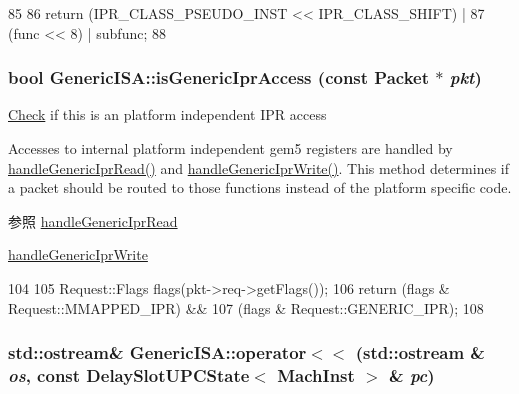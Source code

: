 \begin{DoxyCode}
85     {
86         return (IPR_CLASS_PSEUDO_INST << IPR_CLASS_SHIFT)  |
87             (func << 8) | subfunc;
88     }
\end{DoxyCode}
\hypertarget{namespaceGenericISA_a5570d3282731abc7bd1318962834300e}{
\subsubsection[{isGenericIprAccess}]{\setlength{\rightskip}{0pt plus 5cm}bool GenericISA::isGenericIprAccess (const {\bf Packet} $\ast$ {\em pkt})}}
\label{namespaceGenericISA_a5570d3282731abc7bd1318962834300e}
\hyperlink{classCheck}{Check} if this is an platform independent IPR access

Accesses to internal platform independent gem5 registers are handled by \hyperlink{namespaceGenericISA_ac1de480955fd7b1b8b658e4faaece886}{handleGenericIprRead()} and \hyperlink{namespaceGenericISA_a1412c2f2794674f9be65d92b5b0f0b18}{handleGenericIprWrite()}. This method determines if a packet should be routed to those functions instead of the platform specific code.

\begin{DoxySeeAlso}{参照}
\hyperlink{namespaceGenericISA_ac1de480955fd7b1b8b658e4faaece886}{handleGenericIprRead} 

\hyperlink{namespaceGenericISA_a1412c2f2794674f9be65d92b5b0f0b18}{handleGenericIprWrite} 
\end{DoxySeeAlso}



\begin{DoxyCode}
104     {
105         Request::Flags flags(pkt->req->getFlags());
106         return (flags & Request::MMAPPED_IPR) &&
107             (flags & Request::GENERIC_IPR);
108     }
\end{DoxyCode}
\hypertarget{namespaceGenericISA_a07062a2b0f755aa5b023fb796d2dceed}{
\subsubsection[{operator$<$$<$}]{\setlength{\rightskip}{0pt plus 5cm}std::ostream\& GenericISA::operator$<$$<$ (std::ostream \& {\em os}, \/  const DelaySlotUPCState$<$ MachInst $>$ \& {\em pc})}}
\label{namespaceGenericISA_a07062a2b0f755aa5b023fb796d2dceed}



